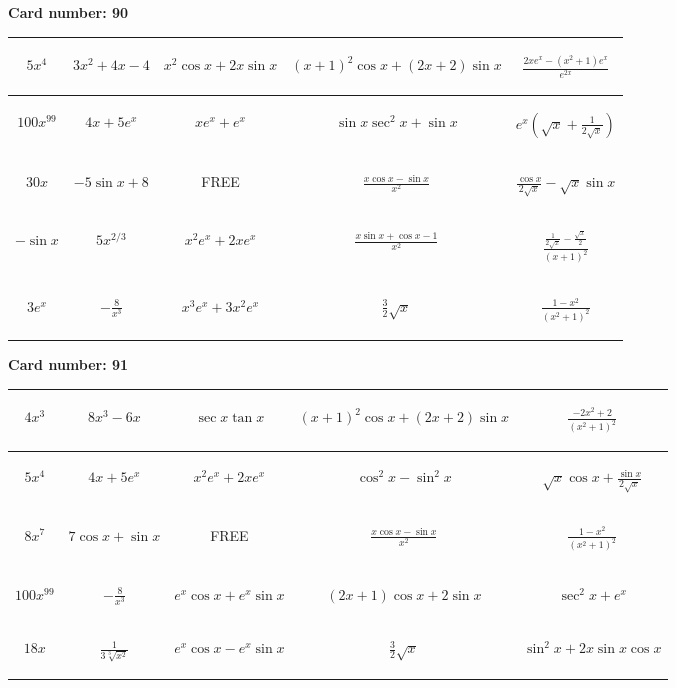 \documentclass{article}
\newcommand{\entry}[1]{\begin{minipage}[t][2.75cm][t]{4cm} \vspace{1cm} \begin{center}#1\end{center} \end{minipage}}
\newcommand{\freespace}{\entry{FREE}}
\newcommand{\cardnumber}[1]{\noindent \textbf{Card number: #1} \bigskip}
\begin{document}
\pagebreak

\cardnumber{90}
\begin{center}
\begin{tabular}{|*{5}{c|}}
    \hline
    \entry{$5x^4$} & \entry{$3x^2 + 4x - 4$} & \entry{$x^2 \cos x + 2x \sin x$} & \entry{$(x + 1)^2 \cos x + (2x + 2) \sin x$} & \entry{$\frac{2x e^x - (x^2 + 1) e^x}{e^{2x}}$} \\ \hline
    \entry{$100x^{99}$} & \entry{$4x + 5e^x$} & \entry{$x e^x + e^x$} & \entry{$\sin x \sec^2 x + \sin x$} & \entry{$e^x \left(\sqrt{x} + \frac{1}{2\sqrt{x}}\right)$} \\ \hline
    \entry{$30x$} & \entry{$-5 \sin x + 8$} & \freespace & \entry{$\frac{x \cos x - \sin x}{x^2}$} & \entry{$\frac{\cos x}{2 \sqrt{x}} - \sqrt{x} \sin x$} \\ \hline
    \entry{$-\sin x$} & \entry{$5x^{2/3}$} & \entry{$x^2 e^x + 2x e^x$} & \entry{$\frac{x \sin x + \cos x - 1}{x^2}$} & \entry{$\frac{\frac{1}{2 \sqrt{x}} - \frac{\sqrt{x}}{2}}{(x + 1)^2}$} \\ \hline
    \entry{$3e^x$} & \entry{$-\frac{8}{x^3}$} & \entry{$x^3 e^x + 3x^2 e^x$} & \entry{$\frac{3}{2} \sqrt{x}$} & \entry{$\frac{1 - x^2}{(x^2 + 1)^2}$} \\ \hline
\end{tabular}
\end{center}

\pagebreak

\cardnumber{91}
\begin{center}
\begin{tabular}{|*{5}{c|}}
    \hline
    \entry{$4x^3$} & \entry{$8x^3 - 6x$} & \entry{$\sec x \tan x$} & \entry{$(x + 1)^2 \cos x + (2x + 2) \sin x$} & \entry{$\frac{-2x^2 + 2}{(x^2 + 1)^2}$} \\ \hline
    \entry{$5x^4$} & \entry{$4x + 5e^x$} & \entry{$x^2 e^x + 2x e^x$} & \entry{$\cos^2 x - \sin^2 x$} & \entry{$\sqrt{x} \cos x + \frac{\sin x}{2 \sqrt{x}}$} \\ \hline
    \entry{$8x^7$} & \entry{$7 \cos x + \sin x$} & \freespace & \entry{$\frac{x \cos x - \sin x}{x^2}$} & \entry{$\frac{1 - x^2}{(x^2 + 1)^2}$} \\ \hline
    \entry{$100x^{99}$} & \entry{$-\frac{8}{x^3}$} & \entry{$e^x \cos x + e^x \sin x$} & \entry{$(2x + 1) \cos x + 2 \sin x$} & \entry{$\sec^2 x + e^x$} \\ \hline
    \entry{$18x$} & \entry{$\frac{1}{3\sqrt[3]{x^2}}$} & \entry{$e^x \cos x - e^x \sin x$} & \entry{$\frac{3}{2} \sqrt{x}$} & \entry{$\sin^2 x + 2x \sin x \cos x$} \\ \hline
\end{tabular}
\end{center}
\end{document}
